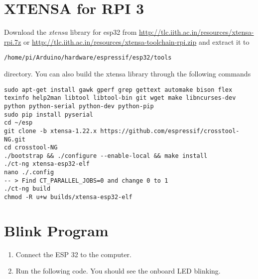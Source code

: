 \documentclass[journal,12pt,twocolumn]{IEEEtran}
\begin{document}
\section{XTENSA for RPI 3}
Download the {\em xtensa} library for esp32 from
\href{http://tlc.iith.ac.in/resources/xtensa-rpi.7z}{http://tlc.iith.ac.in/resources/xtensa-rpi.7z}
or
\href{http://tlc.iith.ac.in/resources/xtensa-toolchain-rpi.zip}{http://tlc.iith.ac.in/resources/xtensa-toolchain-rpi.zip}
and extract it to 
\begin{lstlisting}
/home/pi/Arduino/hardware/espressif/esp32/tools 
\end{lstlisting}
directory.
You can also build the xtensa library through the following commands
\begin{lstlisting}
sudo apt-get install gawk gperf grep gettext automake bison flex texinfo help2man libtool libtool-bin git wget make libncurses-dev python python-serial python-dev python-pip
sudo pip install pyserial
cd ~/esp
git clone -b xtensa-1.22.x https://github.com/espressif/crosstool-NG.git
cd crosstool-NG
./bootstrap && ./configure --enable-local && make install
./ct-ng xtensa-esp32-elf
nano ./.config
-- > Find CT_PARALLEL_JOBS=0 and change 0 to 1
./ct-ng build 
chmod -R u+w builds/xtensa-esp32-elf
\end{lstlisting}
\section{Blink Program}
\begin{enumerate}
\item Connect the ESP 32 to the computer.
\item Run the following code.  You should see the onboard LED blinking.

\end{enumerate}
%
\end{document}
